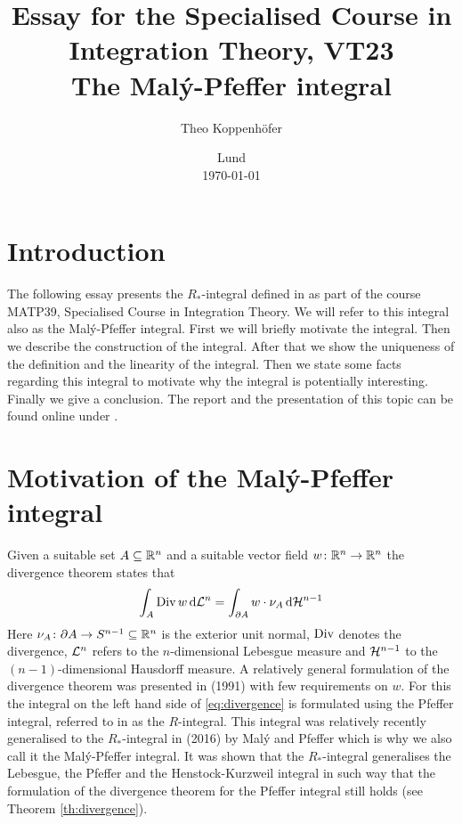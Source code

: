 




\title{ Essay for the Specialised Course in Integration Theory, VT23 \\[1ex]
	  \large The Malý-Pfeffer integral}
\author{Theo Koppenhöfer}
\date{Lund \\[1ex] \today}







\maketitle

\section{Introduction}

The following essay presents the $R_*$-integral defined in \cite{Pfe2016} as part of the course MATP39, Specialised Course in Integration Theory. We will refer to this integral also as the Malý-Pfeffer integral. First we will briefly motivate the integral. Then we describe the construction of the integral. After that we show the uniqueness of the definition and the linearity of the integral. Then we state some facts regarding this integral to motivate why the integral is potentially interesting. Finally we give a conclusion. The report and the presentation of this topic can be found online under \cite{Repository}.


\section{Motivation of the Malý-Pfeffer integral}

Given a suitable set $A\subseteq\mathbb{R}^n$ and a suitable vector field $w\colon\mathbb{R}^n\to\mathbb{R}^n$ the divergence theorem states that
\begin{align}
	\int_A\operatorname{Div} w\,\mathrm{d} \mathcal{L}^n=\int_{\partial A}w\cdot\nu_A\,\mathrm{d} \mathcal{H}^{n-1}\label{eq:divergence}
\end{align}
Here $\nu_A\colon \partial A\to S^{n-1}\subseteq\mathbb{R}^n$ is the exterior unit normal, $\operatorname{Div}$ denotes the divergence, $\mathcal{L}^n$ refers to the $n$-dimensional Lebesgue measure and $\mathcal{H}^{n-1}$ to the $(n-1)$-dimensional Hausdorff measure. A relatively general formulation of the divergence theorem was presented in \cite{Pfe1991} (1991) with few requirements on $w$. For this the integral on the left hand side of \eqref{eq:divergence} is formulated using the Pfeffer integral, referred to in \cite{Pfe2016} as the $R$-integral. This integral was relatively recently generalised to the $R_*$-integral in \cite{Pfe2016} (2016) by Malý and Pfeffer which is why we also call it the Malý-Pfeffer integral. It was shown that the $R_*$-integral generalises the Lebesgue, the Pfeffer and the Henstock-Kurzweil integral in such way that the formulation of the divergence theorem for the Pfeffer integral still holds (see Theorem \ref{th:divergence}).

